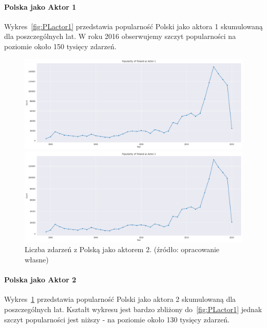 \documentclass[11pt]{report}
\begin{document}
    \paragraph{Polska jako Aktor 1}
    Wykres~\ref{fig:PLactor1} przedstawia popularność Polski jako aktora 1 skumulowaną dla poszczególnych lat.
    W roku 2016 obserwujemy szczyt popularności na poziomie około 150 tysięcy zdarzeń.
    \begin{figure}[!htp]
        \centering
        \includegraphics[width=\linewidth]{fig/PL/PLactor1.png}
        \caption{Liczba zdarzeń z Polską jako aktorem 1. (źródło: opracowanie własne)}
        \label{fig:PLactor1}
        \includegraphics[width=\linewidth]{fig/PL/PLactor2.png}
        \caption{Liczba zdarzeń z Polską jako aktorem 2. (źródło: opracowanie własne)}
        \label{fig:PLactor2}
    \end{figure}

    \paragraph{Polska jako Aktor 2}
    Wykres~\ref{fig:PLactor2} przedstawia popularność Polski jako aktora 2 skumulowaną dla poszczególnych lat. Kształt wykresu jest bardzo zbliżony do~\ref{fig:PLactor1} jednak szczyt popularności jest niższy - na poziomie około 130 tysięcy zdarzeń.
\end{document}
